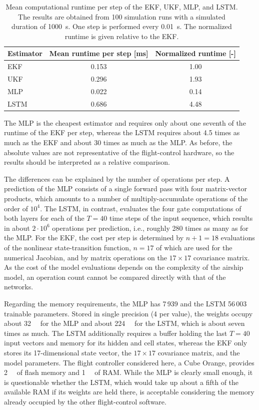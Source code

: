 \begin{table}[htb]
	\centering
	\caption{Mean computational runtime per step of the EKF, UKF, MLP, and LSTM. The results are obtained from 100 simulation runs with a simulated duration of \SI{1000}{s}. One step is performed every \SI{0.01}{s}. The normalized runtime is given relative to the EKF.}
	\label{tab:runtime_all}
	\begin{tabular}{lcc}
		\toprule
		Estimator & Mean runtime per step [ms] & Normalized runtime [-] \\
		\midrule
		EKF  & 0.153 & 1.00 \\
		UKF  & 0.296 & 1.93 \\
		MLP  & 0.022 & 0.14 \\
		LSTM & 0.686 & 4.48 \\
		\bottomrule
	\end{tabular}
\end{table}

The MLP is the cheapest estimator and requires only about one seventh of the runtime of the EKF per step, whereas the LSTM requires about 4.5 times as much as the EKF and about 30 times as much as the MLP. As before, the absolute values are not representative of the flight-control hardware, so the results should be interpreted as a relative comparison.

The differences can be explained by the number of operations per step. A prediction of the MLP consists of a single forward pass with four matrix-vector products, which amounts to a number of multiply-accumulate operations of the order of $10^4$. The LSTM, in contrast, evaluates the four gate computations of both layers for each of the $T = 40$ time steps of the input sequence, which results in about $2 \cdot 10^6$ operations per prediction, i.e., roughly 280 times as many as for the MLP. For the EKF, the cost per step is determined by $n + 1 = 18$ evaluations of the nonlinear state-transition function, $n = 17$ of which are used for the numerical Jacobian, and by matrix operations on the $17 \times 17$ covariance matrix. As the cost of the model evaluations depends on the complexity of the airship model, an operation count cannot be compared directly with that of the networks.

Regarding the memory requirements, the MLP has 7\,939 and the LSTM 56\,003 trainable parameters. Stored in single precision (\SI{4}{\byte} per value), the weights occupy about \SI{32}{\kilo\byte} for the MLP and about \SI{224}{\kilo\byte} for the LSTM, which is about seven times as much. The LSTM additionally requires a buffer holding the last $T = 40$ input vectors and memory for its hidden and cell states, whereas the EKF only stores its 17-dimensional state vector, the $17 \times 17$ covariance matrix, and the model parameters. The flight controller considered here, a Cube Orange, provides \SI{2}{\mega\byte} of flash memory and \SI{1}{\mega\byte} of RAM. While the MLP is clearly small enough, it is questionable whether the LSTM, which would take up about a fifth of the available RAM if its weights are held there, is acceptable considering the memory already occupied by the other flight-control software.

